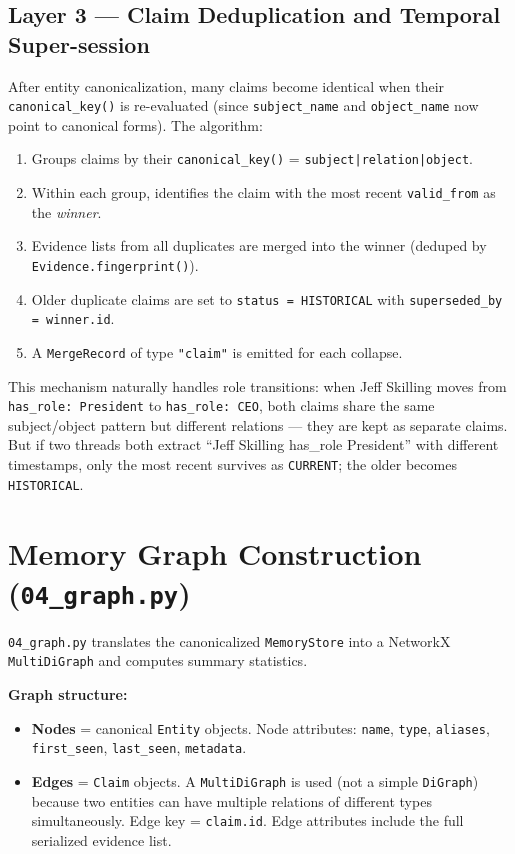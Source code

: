 \documentclass[12pt,a4paper]{article}
\begin{document}
\subsection{Layer 3 — Claim Deduplication and Temporal Super-session}

After entity canonicalization, many claims become identical when their \texttt{canonical\_key()} is re-evaluated (since \texttt{subject\_name} and \texttt{object\_name} now point to canonical forms). The algorithm:

\begin{enumerate}
    \item Groups claims by their \texttt{canonical\_key()} = \texttt{subject|relation|object}.
    \item Within each group, identifies the claim with the most recent \texttt{valid\_from} as the \textit{winner}.
    \item Evidence lists from all duplicates are merged into the winner (deduped by \texttt{Evidence.fingerprint()}).
    \item Older duplicate claims are set to \texttt{status = HISTORICAL} with \texttt{superseded\_by = winner.id}.
    \item A \texttt{MergeRecord} of type \texttt{"claim"} is emitted for each collapse.
\end{enumerate}

This mechanism naturally handles role transitions: when Jeff Skilling moves from \texttt{has\_role: President} to \texttt{has\_role: CEO}, both claims share the same subject/object pattern but different relations — they are kept as separate claims. But if two threads both extract ``Jeff Skilling has\_role President'' with different timestamps, only the most recent survives as \texttt{CURRENT}; the older becomes \texttt{HISTORICAL}.

\section{Memory Graph Construction (\texttt{04\_graph.py})}

\texttt{04\_graph.py} translates the canonicalized \texttt{MemoryStore} into a NetworkX \texttt{MultiDiGraph} and computes summary statistics.

\textbf{Graph structure:}
\begin{itemize}
    \item \textbf{Nodes} = canonical \texttt{Entity} objects. Node attributes: \texttt{name}, \texttt{type}, \texttt{aliases}, \texttt{first\_seen}, \texttt{last\_seen}, \texttt{metadata}.
    \item \textbf{Edges} = \texttt{Claim} objects. A \texttt{MultiDiGraph} is used (not a simple \texttt{DiGraph}) because two entities can have multiple relations of different types simultaneously. Edge key = \texttt{claim.id}. Edge attributes include the full serialized evidence list.
\end{itemize}
\end{document}
